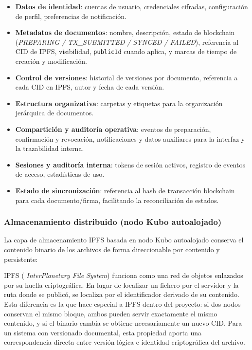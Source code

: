 \documentclass[11pt, a4paper]{article}
\begin{document}
\begin{itemize}
    \item \textbf{Datos de identidad}: cuentas de usuario, credenciales cifradas, configuración de perfil, preferencias de notificación.
    \item \textbf{Metadatos de documentos}: nombre, descripción, estado de blockchain (\textit{PREPARING / TX\_SUBMITTED / SYNCED / FAILED}), referencia al CID de IPFS, visibilidad, \texttt{publicId} cuando aplica, y marcas de tiempo de creación y modificación.
    \item \textbf{Control de versiones}: historial de versiones por documento, referencia a cada CID en IPFS, autor y fecha de cada versión.
    \item \textbf{Estructura organizativa}: carpetas y etiquetas para la organización jerárquica de documentos.
    \item \textbf{Compartición y auditoría operativa}: eventos de preparación, confirmación y revocación, notificaciones y datos auxiliares para la interfaz y la trazabilidad interna.
    \item \textbf{Sesiones y auditoría interna}: tokens de sesión activos, registro de eventos de acceso, estadísticas de uso.
    \item \textbf{Estado de sincronización}: referencia al hash de transacción blockchain para cada documento/firma, facilitando la reconciliación de estados.
\end{itemize}

\subsubsection{Almacenamiento distribuido (nodo Kubo autoalojado)}

La capa de almacenamiento IPFS basada en nodo Kubo autoalojado conserva el contenido binario de los archivos de forma direccionable por contenido y persistente:

IPFS (
\textit{InterPlanetary File System}) funciona como una red de objetos enlazados por su huella criptográfica. En lugar de localizar un fichero por el servidor y la ruta donde se publicó, se localiza por el identificador derivado de su contenido. Esta diferencia es la que hace especial a IPFS dentro del proyecto: si dos nodos conservan el mismo bloque, ambos pueden servir exactamente el mismo contenido, y si el binario cambia se obtiene necesariamente un nuevo CID. Para un sistema con versionado documental, esta propiedad aporta una correspondencia directa entre versión lógica e identidad criptográfica del archivo.
\end{document}
